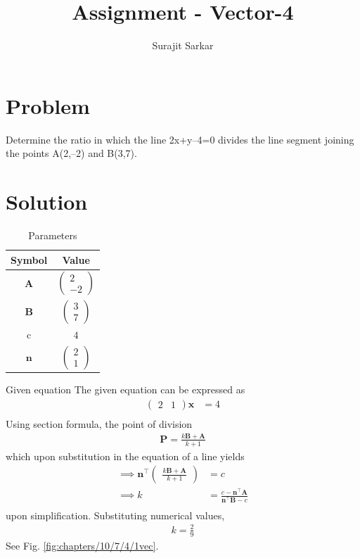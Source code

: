 \documentclass[journal,12pt,twocolumn]{IEEEtran}
\title{\mytitle}
\title{
Assignment - Vector-4
}
\author{Surajit Sarkar}
\newcommand{\myvec}[1]{\ensuremath{\begin{pmatrix}#1\end{pmatrix}}}
\let\vec\mathbf
\begin{document}
\maketitle
\bigskip
\section{\textbf{Problem}}
Determine the ratio in which the line 2x+y–4=0 divides the line segment joining the points A(2,–2) and B(3,7).
\section{\textbf{Solution}}
\begin{table}[h]
    \centering
    \begin{tabular}{|c|c|}
       \hline
       \textbf{Symbol}&\textbf{Value}  \\
       \hline
	    $\vec{A}$ & $\myvec{2\\-2}$\\
        \hline
	    $\vec{B}$ & $\myvec{3\\7}$\\
        \hline
	    c&$4$\\
        \hline
       $\vec{n}$ & $\myvec{2\\1}$\\
       \hline
    \end{tabular}
    \caption{Parameters}
    \label{tab:my_label}
\end{table}
Given equation
\fi
The given equation can be expressed as
\begin{align}
    \myvec{2&1}\vec{x}&=4\\
\end{align}
Using section formula, the point of division 
\begin{align}
    \vec{P} = \frac{k\vec{B+A}}{k+1}
\end{align}
which upon substitution in the equation of a line yields
\begin{align}
    \implies\vec{n}^{\top}\myvec{\frac{k\vec{B+A}}{k+1}}&=c\\
    \implies k&=\frac{c-\vec{n}^{\top}\vec{A}}{\vec{n}^{\top}\vec{B}-c}\\
\end{align}
upon simplification.  Substituting numerical values, 
\begin{align}
    k=\frac{2}{9}
\end{align}
See Fig. 
\ref{fig:chapters/10/7/4/1vec}.
\end{document}
